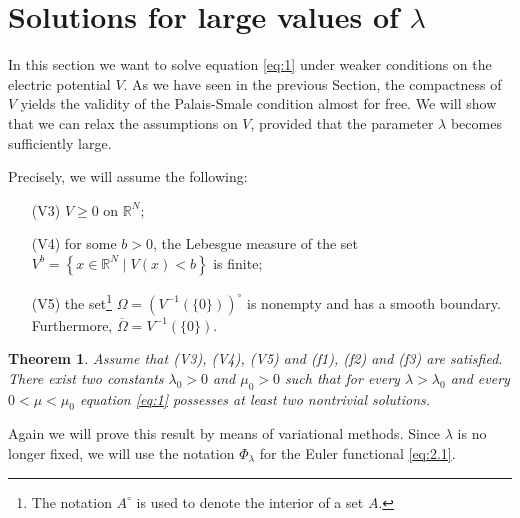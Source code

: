\documentclass[11pt]{amsart}
\numberwithin{equation}{section}
\newtheorem{theorem}{Theorem}[section]
\theoremstyle{remark}
\theoremstyle{definition}
\begin{document}
\section{Solutions for large values of $\lambda$}

In this section we want to solve equation \eqref{eq:1} under weaker conditions on the electric potential $V$. As we have seen in the previous Section, the compactness of $V$ yields the validity of the Palais-Smale condition almost for free. We will show that we can relax the assumptions on $V$, provided that the parameter $\lambda$ becomes sufficiently large. 

Precisely, we will assume the following:
\begin{itemize}
	\item[(V3)] $V \geqslant 0$ on $\mathbb{R}^N$;
	\item[(V4)] for some $b>0$, the Lebesgue measure of the set $V^b = \left\{ x \in \mathbb{R}^N \mid V(x) < b \right\}$ is finite;
	\item[(V5)] the set\footnote{The notation $A^\circ$ is used to denote the interior of a set $A$.} $\Omega = \left(V^{-1} \left( \{0\} \right) \right)^\circ$ is nonempty and has a smooth boundary. Furthermore, $\overline{\Omega} = V^{-1}(\{0\})$.
\end{itemize}
\begin{theorem} \label{th:3.1}
	Assume that (V3), (V4), (V5) and (f1), (f2) and (f3) are satisfied.	There exist two constants $\lambda_0>0$ and $\mu_0>0$ such that for every $\lambda > \lambda_0$ and every $0<\mu<\mu_0$ equation \eqref{eq:1} possesses at least two nontrivial solutions.
\end{theorem}
Again we will prove this result by means of variational methods. Since $\lambda$ is no longer fixed, we will use the notation $\Phi_\lambda$ for the Euler functional \eqref{eq:2.1}.
\end{document}
